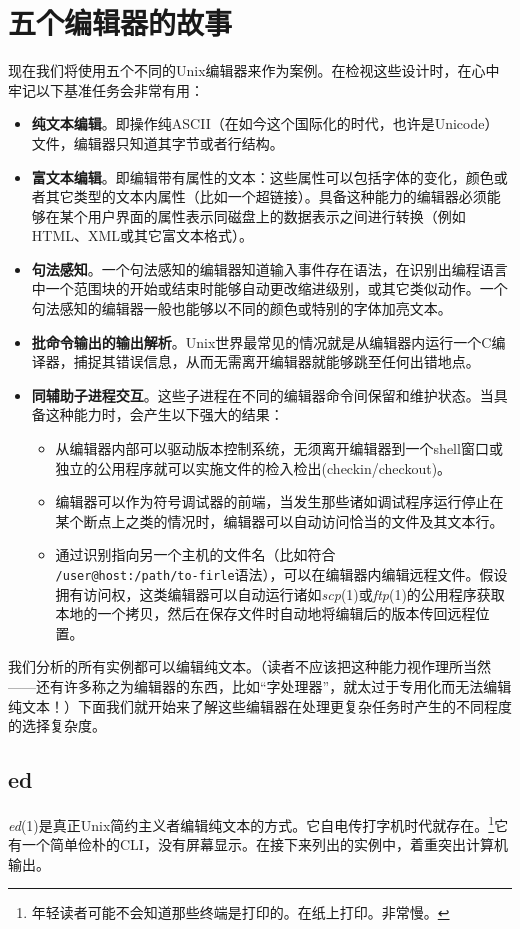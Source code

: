 \documentclass[12pt,oneside]{book}
\begin{document}
\section{五个编辑器的故事}
现在我们将使用五个不同的Unix编辑器来作为案例。在检视这些设计时，在心中牢记以下基准任务会非常有用：
\begin{itemize}
\item \textbf{纯文本编辑}。即操作纯ASCII（在如今这个国际化的时代，也许是Unicode）文件，编辑器只知道其字节或者行结构。
\item \textbf{富文本编辑}。即编辑带有属性的文本：这些属性可以包括字体的变化，颜色或者其它类型的文本内属性（比如一个超链接）。具备这种能力的编辑器必须能够在某个用户界面的属性表示同磁盘上的数据表示之间进行转换（例如HTML、XML或其它富文本格式）。
\item \textbf{句法感知}。一个句法感知的编辑器知道输入事件存在语法，在识别出编程语言中一个范围块的开始或结束时能够自动更改缩进级别，或其它类似动作。一个句法感知的编辑器一般也能够以不同的颜色或特别的字体加亮文本。
\item \textbf{批命令输出的输出解析}。Unix世界最常见的情况就是从编辑器内运行一个C编译器，捕捉其错误信息，从而无需离开编辑器就能够跳至任何出错地点。
\item \textbf{同辅助子进程交互}。这些子进程在不同的编辑器命令间保留和维护状态。当具备这种能力时，会产生以下强大的结果：
\begin{itemize}
\item 从编辑器内部可以驱动版本控制系统，无须离开编辑器到一个shell窗口或独立的公用程序就可以实施文件的检入检出(checkin/checkout)。
\item 编辑器可以作为符号调试器的前端，当发生那些诸如调试程序运行停止在某个断点上之类的情况时，编辑器可以自动访问恰当的文件及其文本行。
\item 通过识别指向另一个主机的文件名（比如符合\\ \verb+/user@host:/path/to-firle+语法），可以在编辑器内编辑远程文件。假设拥有访问权，这类编辑器可以自动运行诸如\textit{scp}(1)或\textit{ftp}(1)的公用程序获取本地的一个拷贝，然后在保存文件时自动地将编辑后的版本传回远程位置。
\end{itemize}
\end{itemize}

我们分析的所有实例都可以编辑纯文本。（读者不应该把这种能力视作理所当然——还有许多称之为编辑器的东西，比如“字处理器”，就太过于专用化而无法编辑纯文本！）下面我们就开始来了解这些编辑器在处理更复杂任务时产生的不同程度的选择复杂度。


\subsection{ed}
\textit{ed}(1)是真正Unix简约主义者编辑纯文本的方式。它自电传打字机时代就存在。\footnote{年轻读者可能不会知道那些终端是打印的。在纸上打印。非常慢。}它有一个简单俭朴的CLI，没有屏幕显示。在接下来列出的实例中，着重突出计算机输出。
\end{document}
